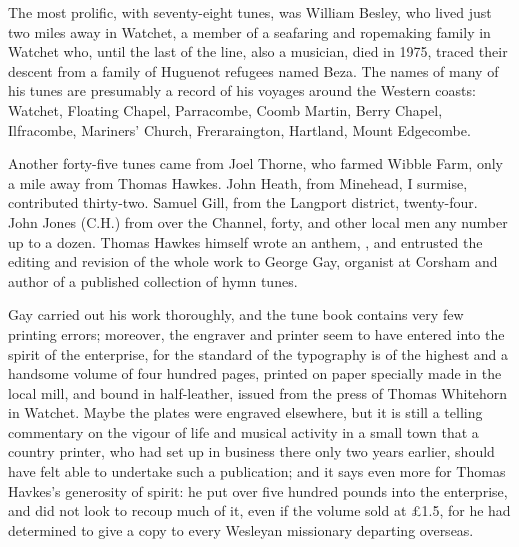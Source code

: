 The most prolific, with seventy-eight tunes, was William Besley, who lived just two miles away in Watchet, a member of a seafaring and ropemaking family in Watchet who, until the last of the line, also a musician, died in 1975, traced their descent from a family of Huguenot refugees named Beza. The names of many of his tunes are presumably a record of his voyages around the Western coasts: Watchet, Floating Chapel, Parracombe, Coomb Martin, Berry Chapel, Ilfracombe, Mariners' Church, Freraraington, Hartland, Mount Edgecombe.

Another forty-five tunes came from Joel Thorne, who farmed Wibble Farm, only a mile away from Thomas Hawkes. John Heath, from Minehead, I surmise, contributed thirty-two. Samuel Gill, from the Langport district, twenty-four. John Jones (C.H.) from over the Channel, forty, and other local men any number up to a dozen. Thomas Hawkes himself wrote an anthem, , and entrusted the editing and revision of the whole work to George Gay, organist at Corsham and author of a published collection of hymn tunes.

Gay carried out his work thoroughly, and the tune book contains very few printing errors; moreover, the engraver and printer seem to have entered into the spirit of the enterprise, for the standard of the typography is of the highest and a handsome volume of four hundred pages, printed on paper specially made in the local mill, and bound in half-leather, issued from the press of Thomas Whitehorn in Watchet. Maybe the plates were engraved elsewhere, but it is still a telling commentary on the vigour of life and musical activity in a small town that a country printer, who had set up in business there only two years earlier, should have felt able to undertake such a publication; and it says even more for Thomas Havkes's generosity of spirit: he put over five hundred pounds into the enterprise, and did not look to recoup much of it, even if the volume sold at £1.5, for he had determined to give a copy to every Wesleyan missionary departing overseas.

